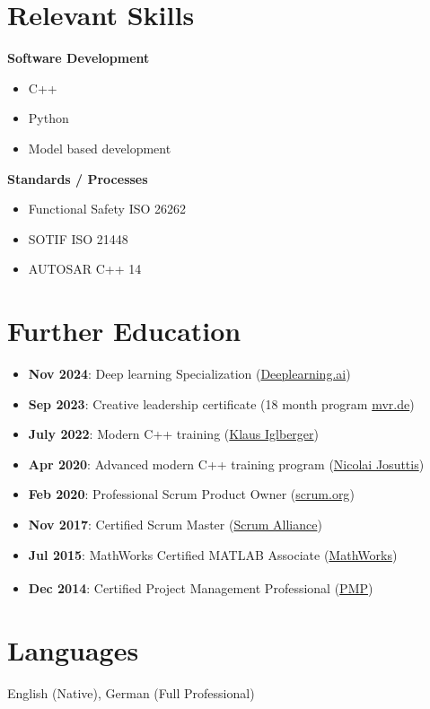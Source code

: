 \documentclass[10pt,a4paper]{article}
\begin{document}
\section*{Relevant Skills}

\begin{minipage}[t]{0.48\textwidth}
    \textbf{\textcolor{primary}{Software Development}}
    \begin{itemize}
        \item C++
        \item Python
        \item Model based development
    \end{itemize}
\end{minipage}
\hfill
\begin{minipage}[t]{0.48\textwidth}
    \textbf{\textcolor{primary}{Standards / Processes}}
    \begin{itemize}
        \item Functional Safety ISO 26262
        \item SOTIF ISO 21448
        \item AUTOSAR C++ 14
    \end{itemize}
\end{minipage}

\vspace{1.2em}

\section*{Further Education}

\begin{itemize}
    \item \textbf{Nov 2024}: Deep learning Specialization (\href{https://www.deeplearning.ai}{Deeplearning.ai})
    \item \textbf{Sep 2023}: Creative leadership certificate (18 month program \href{https://mvr.de}{mvr.de})
    \item \textbf{July 2022}: Modern C++ training (\href{https://klaus-iglberger.com}{Klaus Iglberger})
    \item \textbf{Apr 2020}: Advanced modern C++ training program (\href{https://nicolaijosuttis.com}{Nicolai Josuttis})
    \item \textbf{Feb 2020}: Professional Scrum Product Owner (\href{https://scrum.org}{scrum.org})
    \item \textbf{Nov 2017}: Certified Scrum Master (\href{https://scrumalliance.org}{Scrum Alliance})
    \item \textbf{Jul 2015}: MathWorks Certified MATLAB Associate (\href{https://www.mathworks.com}{MathWorks})
    \item \textbf{Dec 2014}: Certified Project Management Professional (\href{https://www.pmi.org}{PMP}\textsuperscript{\textregistered})
\end{itemize}

\vspace{1.2em}


\section*{Languages}
English (Native), German (Full Professional)
\end{document}
